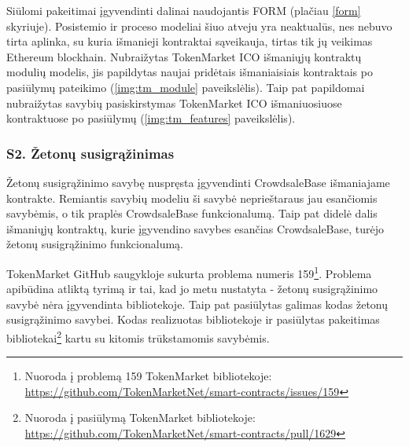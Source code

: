 \documentclass{VUMIFPSbakalaurinis}
\begin{document}
Siūlomi pakeitimai įgyvendinti dalinai naudojantis FORM (plačiau \ref{form} skyriuje).  Posistemio ir proceso modeliai šiuo atveju yra neaktualūs, nes nebuvo tirta aplinka, su kuria išmanieji kontraktai sąveikauja, tirtas tik jų veikimas Ethereum blockhain. Nubraižytas TokenMarket ICO išmaniųjų kontraktų modulių modelis, jis papildytas naujai pridėtais išmaniaisiais kontraktais po pasiūlymų pateikimo (\ref{img:tm_module} paveikslėlis). Taip pat papildomai nubraižytas savybių pasiskirstymas TokenMarket ICO išmaniuosiuose kontraktuose po pasiūlymų (\ref{img:tm_features} paveikslėlis).




\subsubsection{S2. Žetonų susigrąžinimas} \label{suggestions:s2}

Žetonų susigrąžinimo savybę nuspręsta įgyvendinti CrowdsaleBase išmaniajame kontrakte. Remiantis savybių modeliu ši savybė neprieštaraus jau esančiomis savybėmis, o tik praplės CrowdsaleBase funkcionalumą. Taip pat didelė dalis išmaniųjų kontraktų, kurie įgyvendino savybes esančias CrowdsaleBase, turėjo žetonų susigrąžinimo funkcionalumą.

TokenMarket GitHub saugykloje sukurta problema numeris 159\footnote{Nuoroda į problemą 159 TokenMarket bibliotekoje: \url{https://github.com/TokenMarketNet/smart-contracts/issues/159}}. Problema apibūdina atliktą tyrimą ir tai, kad jo metu nustatyta - žetonų susigrąžinimo savybė nėra įgyvendinta bibliotekoje. Taip pat pasiūlytas galimas kodas žetonų susigrąžinimo savybei. Kodas realizuotas bibliotekoje ir pasiūlytas pakeitimas bibliotekai\footnote{Nuoroda į pasiūlymą TokenMarket bibliotekoje: \url{https://github.com/TokenMarketNet/smart-contracts/pull/1629}} kartu su kitomis trūkstamomis savybėmis.
\end{document}
